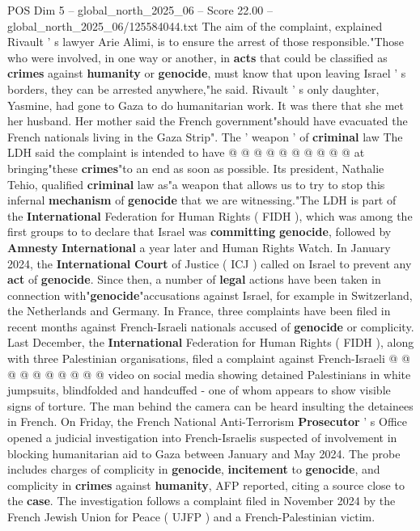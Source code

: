 \begin{textsample}{POS Dim 5 – global\_north\_2025\_06 – Score 22.00 – global\_north\_2025\_06/125584044.txt}
The aim of the complaint, explained Rivault ' s lawyer Arie Alimi, is to ensure the arrest of those responsible."Those who were involved, in one way or another, in \textbf{acts} that could be classified as \textbf{crimes} against \textbf{humanity} or \textbf{genocide}, must know that upon leaving Israel ' s borders, they can be arrested anywhere,"he said.
Rivault ' s only daughter, Yasmine, had gone to Gaza to do humanitarian work.
It was there that she met her husband.
Her mother said the French government"should have evacuated the French nationals living in the Gaza Strip".
The ' weapon ' of \textbf{criminal} law The LDH said the complaint is intended to have @ @ @ @ @ @ @ @ @ @ at bringing"these \textbf{crimes}"to an end as soon as possible.
Its president, Nathalie Tehio, qualified \textbf{criminal} law as"a weapon that allows us to try to stop this infernal \textbf{mechanism} of \textbf{genocide} that we are witnessing."The LDH is part of the \textbf{International} Federation for Human Rights ( FIDH ), which was among the first groups to to declare that Israel was \textbf{committing} \textbf{genocide}, followed by \textbf{Amnesty} \textbf{International} a year later and Human Rights Watch.
In January 2024, the \textbf{International} \textbf{Court} of Justice ( ICJ ) called on Israel to prevent any \textbf{act} of \textbf{genocide}.
Since then, a number of \textbf{legal} actions have been taken in connection with"\textbf{genocide}"accusations against Israel, for example in Switzerland, the Netherlands and Germany.
In France, three complaints have been filed in recent months against French-Israeli nationals accused of \textbf{genocide} or complicity.
Last December, the \textbf{International} Federation for Human Rights ( FIDH ), along with three Palestinian organisations, filed a complaint against French-Israeli @ @ @ @ @ @ @ @ @ @ video on social media showing detained Palestinians in white jumpsuits, blindfolded and handcuffed - one of whom appears to show visible signs of torture.
The man behind the camera can be heard insulting the detainees in French.
On Friday, the French National Anti-Terrorism \textbf{Prosecutor} ' s Office opened a judicial investigation into French-Israelis suspected of involvement in blocking humanitarian aid to Gaza between January and May 2024.
The probe includes charges of complicity in \textbf{genocide}, \textbf{incitement} to \textbf{genocide}, and complicity in \textbf{crimes} against \textbf{humanity}, AFP reported, citing a source close to the \textbf{case}.
The investigation follows a complaint filed in November 2024 by the French Jewish Union for Peace ( UJFP ) and a French-Palestinian victim.

\end{textsample}
